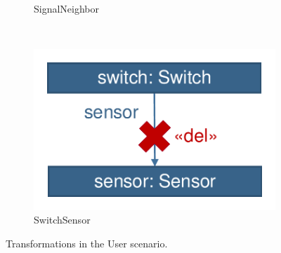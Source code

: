 \begin{figure}
\begin{subfigure}[b]{0.3\textwidth}
                \caption{\textsf{SignalNeighbor}}
                \label{fig:trainbenchmark-transformation-user-signalneighbor}
        \end{subfigure}%
        ~
        \begin{subfigure}[b]{0.3\textwidth}
                \centering
                \includegraphics[scale=0.4]{figures/trainbenchmark-transformation-user-switchsensor}
                \caption{\textsf{SwitchSensor}}
                \label{fig:trainbenchmark-transformation-user-switchsensor}
        \end{subfigure}
        \caption{Transformations in the User scenario.}
        \label{fig:trainbenchmark-transformations-xform}
\end{figure}


